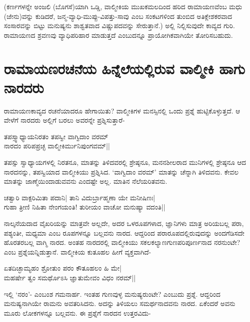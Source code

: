 (ಕರ್ಣಗಳನ್ನೇ ಅಂಜಲಿ (ಬೊಗಸೆ)ಯಾಗಿ ಒಡ್ಡಿ, ವಾಲ್ಮೀಕಿಯ ಮುಖಕಮಲದಿಂದ ಹರಿದ ರಾಮಾಯಣವೆಂಬ ಮಧು (ಜೇನು)ವನ್ನು ಕುಡಿದರೆ, ಜನ್ಮ-ವ್ಯಾಧಿ-ಮುಪ್ಪು-ವಿಪತ್ತು-ಸಾವು ಎಂಬ ಸಂಕಟಗಳಿಂದ ತುಂಬಿದ ಅತಿಕ್ಲೇಶಕರವಾದ ಸಂಸಾರವನ್ನು ಬಿಟ್ಟು ಮನುಷ್ಯನು ಶಾಶ್ವತವಾದ ವಿಷ್ಣುಪದವನ್ನು ಸೇರುತ್ತಾನೆ.) ಅಲ್ಲಿ ನಿಲ್ಲಿಸುವುದೇ ಕಾವ್ಯದ ಗುರಿ. ರಾಮಾಯಣದ ಶ್ರವಣವು ವ್ಯಾಧಿಪರಿಹಾರ ಮಾಡುತ್ತದೆ ಎಂಬುದನ್ನೂ ಪ್ರಾಯೋಗಿಕವಾಗಿಯೇ ತೋರಿಸಬಹುದು. 

\section*{ರಾಮಾಯಣರಚನೆಯ ಹಿನ್ನೆಲೆಯಲ್ಲಿರುವ ವಾಲ್ಮೀಕಿ ಹಾಗು ನಾರದರು} 

ರಾಮಾಯಣಕಾವ್ಯದ ರಚನೆಯಾದರೂ ಹೇಗಾಯಿತು? ವಾಲ್ಮೀಕಿಗಳ ಮನಸ್ಸಿನಲ್ಲಿ ಒಂದು ಪ್ರಶ್ನೆ ಹುಟ್ಟಿಕೊಳ್ಳುತ್ತದೆ. ಆ ವೇಳೆಗೆ ನಾರದರು ಅಲ್ಲಿಗೆ ಬರಲು ಅವರನ್ನೇ ಪ್ರಶ್ನಿಸುತ್ತಾರೆ- 

\begin{shloka} 
ತಪಸ್ಸ್ವಾಧ್ಯಾಯನಿರತಂ ತಪಸ್ವೀ ವಾಗ್ವಿದಾಂ ವರಮ್‍\label{153}\\ 
ನಾರದಂ ಪರಿಪಪ್ರಚ್ಛ ವಾಲ್ಮೀಕಿರ್ಮುನಿಪುಂಗವಮ್‍||
\end{shloka} 

ತಪಸ್ಸು ಸ್ವಾಧ್ಯಾಯಗಳಲ್ಲಿ ನಿರತನೂ, ಮಾತನ್ನು ತಿಳಿದವರಲ್ಲಿ ಶ್ರೇಷ್ಠನೂ, ಮನನಶೀಲರಾದ ಮುನಿಗಳಲ್ಲಿ ಶ್ರೇಷ್ಠನೂ ಆದ ನಾರದನನ್ನು, ತಪಸ್ವಿಯಾದ ವಾಲ್ಮೀಕಿಯು ಪ್ರಶ್ನಿಸಿದ. `ವಾಗ್ವಿದಾಂ ವರಮ್‍' ಮಾತನ್ನು ಚೆನ್ನಾಗಿ ತಿಳಿದವನು. ಕೇವಲ ಮಾತನ್ನು ಜಾಣ್ಮೆಯಿಂದಾಡುವವನು ಎಂದಷ್ಟೇ ಅಲ್ಲ. ಮಾತಿನ ನೆಲೆಯರಿತವನು. 

\begin{shloka} 
ಚತ್ವಾರಿ ವಾಕ್ಪರಿಮಿತಾ ಪದಾನಿ| ತಾನಿ ವಿದುರ್ಬ್ರಾಹ್ಮಣಾ ಯೇ ಮನೀಷಿಣಃ|\label{153b}\\ 
ಗುಹಾ ತ್ರೀಣಿ ನಿಹಿತಾ ನೇಂಗಯಂತಿ! ತುರೀಯಂ ವಾಚೋ ಮನುಷ್ಯಾ  ವದಂತಿ||
\end{shloka} 

ನಾಲ್ಕನೆಯದಾದ ವೈಖರಿಯನ್ನು ಮಾತ್ರವೇ ಅಲ್ಲದೇ, ಅದರ ಒಳರೂಪಗಳಾದ, ಜ್ಞಾನಿಗಳು ಮಾತ್ರ ಅರಿಯಬಲ್ಲ ಪರಾ, ಪಶ್ಯಂತೀ, ಮಧ್ಯಮಾ ಎಂಬ ರೂಪಗಳನ್ನೂ ಬಲ್ಲವನು ನಾರದ. ಆದ್ದರಿಂದ ಪರಾರೂಪದಲ್ಲಿರುವುದನ್ನು ಅಂದಗೆಡಿಸದೇ ಹೊರತರಬಲ್ಲ ವಾಗ್ಮಿ ನಾರದ. ಅಂತಹ ನಾರದರಲ್ಲಿ ವಾಲ್ಮೀಕಿಯು ಸಕಲಕಲ್ಯಾಣಗುಣಪರಿಪೂರ್ಣನಾದ ನರನುಂಟೇ? ಎಂಬ ಪ್ರಶ್ನೆಯನ್ನಿಡುತ್ತಾನೆ. ವಾಲ್ಮೀಕಿಯ ಕುತೂಹಲ ಹೀಗೆ ವ್ಯಕ್ತವಾಗಿದೆ- 

\begin{shloka} 
ಏತದಿಚ್ಛಾಮ್ಯಹಂ ಶ್ರೋತುಂ ಪರಂ ಕೌತೂಹಲಂ ಹಿ ಮೇ|\label{153a}\\ 
ಮಹರ್ಷೇ ತ್ವಂ ಸಮರ್ಥೊಽಸಿ ಜ್ಞಾತುಮೇವಂ ವಿಧಂ ನರಮ್‍||
\end{shloka} 

ಇಲ್ಲಿ `ನರಂ'- ಎಂಬಂಶ ಗಮನಾರ್ಹ. ಇಂತಹ ಗುಣವುಳ್ಳ ಮನುಷ್ಯರುಂಟೇ? ಎಂಬುದು ಪ್ರಶ್ನೆ. ಆದ್ದರಿಂದ ಮನುಷ್ಯನಾಗಿಯೇ ರಾಮನು ಅವತರಿಸಿದನು. ಅದನ್ನು ತಿಳಿಯಲು ಸಮರ್ಥನಾದವನು ನಾರದ. ಏಕೆಂದರೆ ಅವನು ಮೂರು ಲೋಕಗಳನ್ನೂ ಬಲ್ಲವನು. ಈ ಪ್ರಶ್ನೆಗೆ ನಾರದನ ಉತ್ತರವಿದು- 

